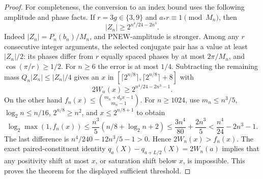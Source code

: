 \begin{proof}
For completeness, the conversion to an index bound uses the
following amplitude and phase facts.  If $r=3g\in\{3,9\}$ and
$a_*r\equiv1\pmod{M_n}$, then
\[
 |Z_n|\ge2^{n^4/24-2n^3}.
\]
Indeed $|Z_n|=P_n(b_n)/M_n$, and PNEW-amplitude is stronger.
Among any $r$ consecutive integer arguments, the selected
conjugate pair has a value at least $|Z_n|/2$: its phases differ
from $r$ equally spaced phases by at most $2\pi/M_n$, and
$\cos(\pi/r)\ge1/2$.  For $n\ge6$ the error is at most
$1/4$.  Subtracting the remaining mass $Q_n|Z_n|\le|Z_n|/4$
gives an $x$ in
$[\lceil2^{n/8}\rceil,\lceil2^{n/8}\rceil+8]$ with
\[
                    2W_n(x)\ge2^{n^4/24-2n^3-1}.
\]
On the other hand
$f_n(x)\le\binom{m_n+d_0x-1}{m_n-1}$.
For $n\ge1024$, use $m_n\le n^3/5$,
$\log_2n\le n/16$, $2^{n/8}\ge n^2$, and
$x\le2^{n/8+1}$ to obtain
\[
 \log_2\max(1,f_n(x))
 \le\frac{n^3}{5}(n/8+\log_2n+2)
 \le\frac{3n^4}{80}+\frac{2n^3}{5}
                  <\frac{n^4}{24}-2n^3-1.
\]
The last difference is $n^4/240-12n^3/5-1>0$.
Hence $2W_n(x)>f_n(x)$.  The exact paired-constituent identity
$q_a(X)-q_{a+L/2}(X)=2W_n(a)$ implies that any positivity shift
at most $x$, or saturation shift below $x$, is impossible.
This proves the theorem for the displayed sufficient threshold.
\end{proof}
